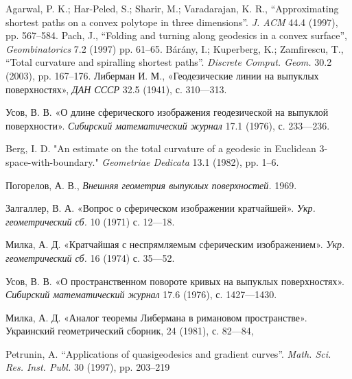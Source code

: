 \begin{thebibliography}{99}
Agarwal, P. K.; Har-Peled, S.; Sharir, M.; Varadarajan, K. R.,
``Approximating shortest paths on a convex polytope in three dimensions''.
\textit{J. ACM}
44.4 (1997),
pp. 567--584.
Pach, J.,
``Folding and turning along geodesics in a convex surface'',
\textit{Geombinatorics}
7.2 (1997)
pp. 61--65.
B{\'a}r{\'a}ny, I.; Kuperberg, K.; Zamfirescu, T.,
``Total curvature and spiralling shortest paths''.
\textit{Discrete Comput. Geom.}
30.2 (2003),
pp. 167--176.
Либерман И. М.,
«Геодезические
 линии
 на
 выпуклых
 поверхностях»,
\textit{ДАН СССР}
32.5 (1941),
с. 310---313. 

Усов, В. В. 
«О длине сферического изображения геодезической на выпуклой поверхности». \textit{Сибирский математический журнал} 
17.1 (1976), 
с. 233---236.

Berg, I. D. 
"An estimate on the total curvature of a geodesic in Euclidean 3-space-with-boundary." 
\textit{Geometriae Dedicata} 
13.1 (1982),
pp. 1--6.

Погорелов, А. В., 
\textit{Внешняя геометрия выпуклых поверхностей.} 
1969.

Залгаллер, В. А. 
«Вопрос о сферическом изображении кратчайшей».
\textit{Укр. геометрический сб.}
10 (1971) 
с. 12---18.

Милка, А. Д. 
«Кратчайшая с неспрямляемым сферическим изображением». 
\textit{Укр. геометрический сб.} 16 (1974)
с. 35---52.

Усов, В. В. 
«О пространственном повороте кривых на выпуклых поверхностях». 
\textit{Сибирский математический журнал}
17.6 (1976),
с. 1427---1430.

Милка, А. Д. 
«Аналог теоремы Либермана в римановом пространстве».
Украинский геометрический сборник,
24 (1981), 
с. 82---84,

Petrunin, A.
``Applications of quasigeodesics and gradient curves''.
\textit{Math. Sci. Res. Inst. Publ.}
30 (1997),
pp. 203--219
\end{thebibliography}